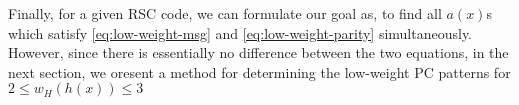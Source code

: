 
Finally, for a given RSC code, we can formulate our goal as, to find all $a(x)$s which satisfy  \eqref{eq:low-weight-msg} and  \eqref{eq:low-weight-parity} simultaneously. However, since there is essentially no difference between the two equations, in the next section, we oresent a method for determining the low-weight PC patterns for $2 \leq w_H(h(x)) \leq 3$



%
%

